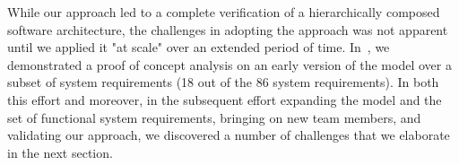 While our approach led to a complete verification of a hierarchically composed software architecture, the challenges in adopting the approach was not apparent until we applied it "at scale" over an extended period of time. In~\cite{hilt2013}, we demonstrated a proof of concept analysis on an early version of the model over a subset of system requirements (18 out of the 86 system requirements). In both this effort and moreover, in the subsequent effort expanding the model and the set of functional system requirements, bringing on new team members, and validating our approach, we discovered a number of challenges that we elaborate in the next section.

%
%


